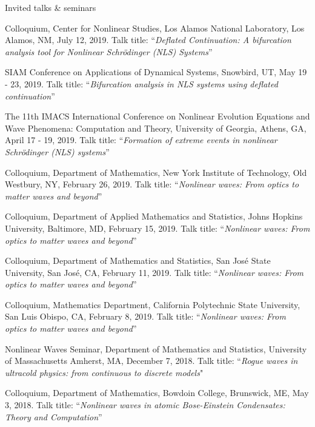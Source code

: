 \documentclass[10pt]{article} %
\begin{document}
\begin{section}{Invited talks \& seminars}
\begin{etaremune}
\item Colloquium, Center for Nonlinear Studies, Los Alamos National Laboratory, Los Alamos, NM, July 12, 2019. 
      Talk title: ``\textit{Deflated Continuation: A bifurcation analysis tool for Nonlinear Schr\"odinger (NLS) Systems}''
       
\item SIAM Conference on Applications of Dynamical Systems, Snowbird, UT, May 19 - 23, 2019. Talk title: 
                    ``\textit{Bifurcation analysis in NLS systems using deflated continuation}''

\item The 11th IMACS International Conference on Nonlinear Evolution Equations and Wave Phenomena: Computation and Theory, %
        University of Georgia, Athens, GA, April 17 - 19, 2019. 
        Talk title: ``\textit{Formation of extreme events in nonlinear Schr\"odinger (NLS) systems}''

\item  Colloquium, Department of Mathematics, New York Institute of Technology, Old Westbury, NY, February 26, 2019.
       Talk title: ``\textit{Nonlinear waves: From optics to matter waves and beyond}''          
        
\item   Colloquium, Department of Applied Mathematics and Statistics, Johns Hopkins University, Baltimore, MD, February 15, 2019.
       Talk title: ``\textit{Nonlinear waves: From optics to matter waves and beyond}''        
        
\item   Colloquium, Department of Mathematics and Statistics, San Jos\'e State University, San Jos\'e, CA, February 11, 2019.
       Talk title: ``\textit{Nonlinear waves: From optics to matter waves and beyond}''
        
\item   Colloquium, Mathematics Department, California Polytechnic State University, San Luis Obispo, CA, February 8, 2019.
       Talk title: ``\textit{Nonlinear waves: From optics to matter waves and beyond}''        
        
\item   Nonlinear Waves Seminar, Department of Mathematics and Statistics, University of Massachusetts Amherst, MA, December 7, 2018.
        Talk title: ``\textit{Rogue waves in ultracold physics: from continuous to discrete models}"        
        
\item   Colloquium, Department of Mathematics, Bowdoin College, Brunswick, ME, May 3, 2018.
        Talk title: ``\textit{Nonlinear waves in atomic Bose-Einstein Condensates: Theory and Computation}''
       

\end{etaremune}
\end{section}
\end{document}

